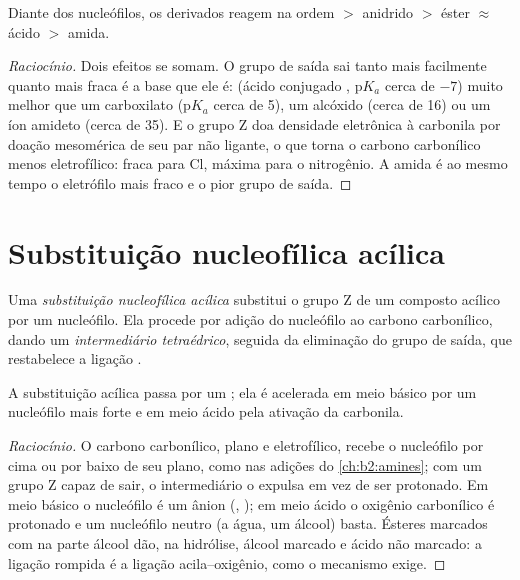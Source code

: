 \begin{proposition}\label{prop:b2:acyl-substitution:reactivity}
Diante dos nucleófilos, os derivados reagem na ordem  $>$ anidrido $>$ éster
$\approx$ ácido $>$ amida.
\end{proposition}

\begin{proof}[Raciocínio]
Dois efeitos se somam. O grupo de saída  sai tanto mais facilmente quanto mais fraca é a
base que ele é:  (ácido conjugado , $\mathrm pK_a$ cerca de $-7$) muito melhor que
um carboxilato ($\mathrm pK_a$ cerca de 5), um alcóxido (cerca de 16) ou um íon amideto (cerca de
35). E o grupo Z doa densidade eletrônica à carbonila por doação mesomérica de seu par não
ligante, o que torna o carbono carbonílico menos eletrofílico: fraca para Cl, máxima para o
nitrogênio. A amida é ao mesmo tempo o eletrófilo mais fraco e o pior grupo de saída.
\end{proof}

\section{Substituição nucleofílica acílica}

\begin{definition}\label{def:b2:acyl-substitution:nas}
Uma \emph{substituição nucleofílica acílica} substitui o grupo Z
de um composto acílico por um nucleófilo. Ela procede por adição do nucleófilo ao carbono
carbonílico, dando um \emph{intermediário tetraédrico}, seguida da
eliminação do grupo de saída, que restabelece a ligação .
\end{definition}

\begin{proposition}\label{prop:b2:acyl-substitution:addition-elimination}
A substituição acílica passa por um ; ela é acelerada em meio básico por um
nucleófilo mais forte e em meio ácido pela ativação da carbonila.
\end{proposition}

\begin{proof}[Raciocínio]
O carbono carbonílico, plano e eletrofílico, recebe o nucleófilo por cima ou por baixo de seu
plano, como nas adições do \cref{ch:b2:amines}; com um grupo Z capaz de sair, o intermediário
o expulsa em vez de ser protonado. Em meio básico o nucleófilo é um ânion (,
); em meio ácido o oxigênio carbonílico é protonado e um nucleófilo neutro (a água, um
álcool) basta. Ésteres marcados com  na parte álcool dão, na hidrólise, álcool marcado
e ácido não marcado: a ligação rompida é a ligação acila--oxigênio, como o mecanismo exige.
\end{proof}

